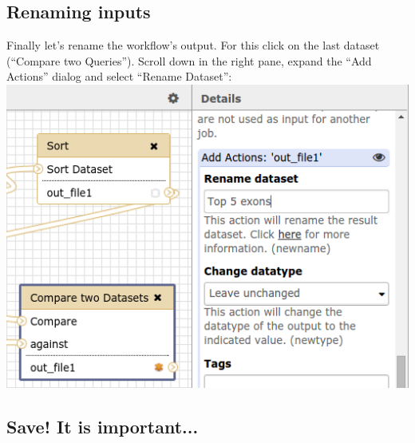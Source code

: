 \documentclass[11pt,a4paper]{article}
\begin{document}
\subsection{Renaming inputs}
Finally let's rename the workflow's output. For this click on the last dataset (``Compare two Queries''). Scroll down in the right pane, expand the ``Add Actions'' dialog and select ``Rename Dataset'':\\
\includegraphics[scale=0.55]{figures/101_34}\\
\subsection{Save! It is important...}



%
%

\newpage

\vspace{-1.5em}

\end{document}
